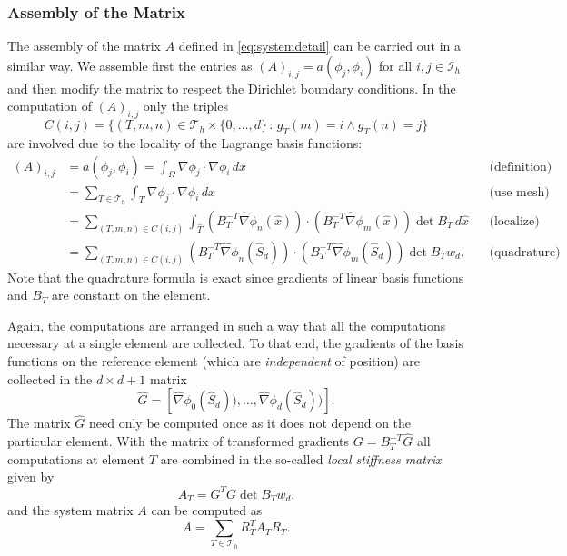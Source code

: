 \documentclass[a4paper,12pt]{article}
\begin{document}
\subsubsection*{Assembly of the Matrix}

The assembly of the matrix $A$ defined in \eqref{eq:systemdetail} can be carried
out in a similar way. We assemble first the entries as $(A)_{i,j}=a(\phi_j,\phi_i)$
for all $i,j\in\mathcal{I}_h$ and then modify the matrix to respect the Dirichlet
boundary conditions. In the computation of $(A)_{i,j}$ only the triples
$$C(i,j) = \{(T,m,n)\in\mathcal{T}_h\times\{0,\ldots,d\} \,:\, g_T(m)=i \wedge g_T(n)=j\}$$
are involved due to the locality of the Lagrange basis functions:
\begin{align*}
(A)_{i,j} &= a(\phi_j,\phi_i) = \int_\Omega \nabla \phi_j \cdot \nabla \phi_i \,dx 
&&\text{(definition)}\\
&= \sum_{T\in\mathcal{T}_h} \int_T \nabla \phi_j \cdot \nabla \phi_i \,dx
&&\text{(use mesh)}\\
&= \sum_{(T,m,n)\in C(i,j)}
\int_{\hat T} (B_T^{-T} \hat\nabla\phi_n(\hat x))\cdot (B_T^{-T} \hat\nabla\phi_m(\hat x))
\det B_T \,d\hat x &&\text{(localize)}\\
&= \sum_{(T,m,n)\in C(i,j)}
(B_T^{-T} \hat\nabla\phi_n(\hat S_d))\cdot (B_T^{-T} \hat\nabla\phi_m(\hat S_d))
\det B_T w_d . &&\text{(quadrature)}
\end{align*}
Note that the quadrature formula is exact since gradients of linear basis functions
and $B_T$ are constant on the element.

Again, the computations are arranged in such a way that all the computations
necessary at a single element are collected. To that end,
the gradients of the basis functions on the reference element (which are {\em independent}
of position) are collected in the $d\times d+1$ matrix
\begin{equation*}
\hat G = \left[\hat\nabla\phi_0(\hat S_d)),\ldots,\hat\nabla\phi_d(\hat S_d))\right] .
\end{equation*}
The matrix $\hat G$ need only be computed once as it does not depend on the
particular element.
With the matrix of transformed gradients $G=B_T^{-T} \hat G$
all computations at element $T$ are 
combined in the so-called {\em local stiffness matrix} given by
\begin{equation}
A_T = G^T G \det B_T w_d .
\label{eq:jacobian_volume}
\end{equation}
and the system matrix $A$ can be computed as
\begin{equation}
A =  \sum_{T\in\mathcal{T}_h} R_T^T A_T R_T .
\label{eq:matrixassembly}
\end{equation}
\end{document}
